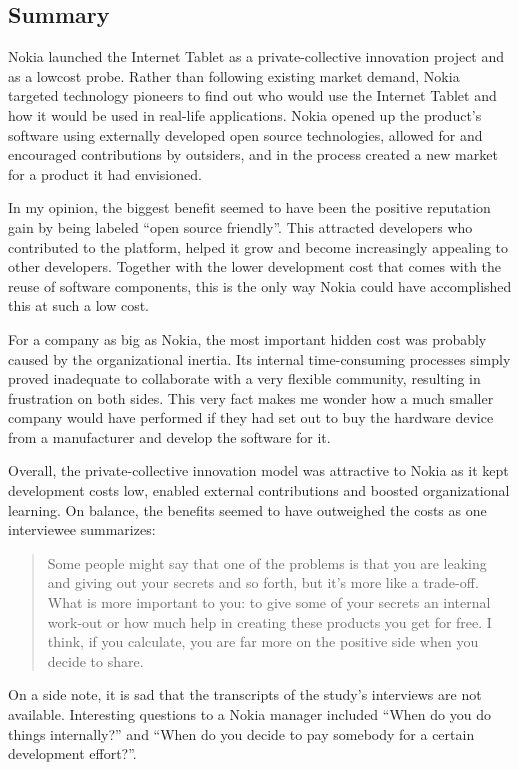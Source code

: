 \documentclass[a4paper]{scrartcl}
\begin{document}
\subsection{Summary}

Nokia launched the Internet Tablet as a private-collective innovation project and as a lowcost probe.
Rather than following existing market demand, Nokia targeted technology pioneers to find out who would use the Internet Tablet and how it would be used in real-life applications.
Nokia opened up the product’s software using externally developed open source technologies, allowed for and encouraged contributions by outsiders, and in the process created a new market for a product it had envisioned.

In my opinion, the biggest benefit seemed to have been the positive reputation gain by being labeled ``open source friendly''.
This attracted developers who contributed to the platform, helped it grow and become increasingly appealing to other developers.
Together with the lower development cost that comes with the reuse of software components, this is the only way Nokia could have accomplished this at such a low cost.

For a company as big as Nokia, the most important hidden cost was probably caused by the organizational inertia.
Its internal time-consuming processes simply proved inadequate to collaborate with a very flexible community, resulting in frustration on both sides. 
This very fact makes me wonder how a much smaller company would have performed if they had set out to buy the hardware device from a manufacturer and develop the software for it. 

Overall, the private-collective innovation model was attractive to Nokia as it kept development costs low, enabled external contributions and boosted organizational learning.
On balance, the benefits seemed to have outweighed the costs as one interviewee summarizes:

\begin{quotation}
Some people might say that one of the problems
is that you are leaking and giving out
your secrets and so forth, but it’s more like a
trade-off. What is more important to you: to
give some of your secrets an internal work-out
or how much help in creating these products
you get for free. I think, if you calculate, you
are far more on the positive side when you
decide to share.
\end{quotation}

On a side note, it is sad that the transcripts of the study's interviews are not available. Interesting questions to a Nokia manager included ``When do you do things internally?'' and  ``When do you decide to pay somebody for a certain development effort?''.
\end{document}
